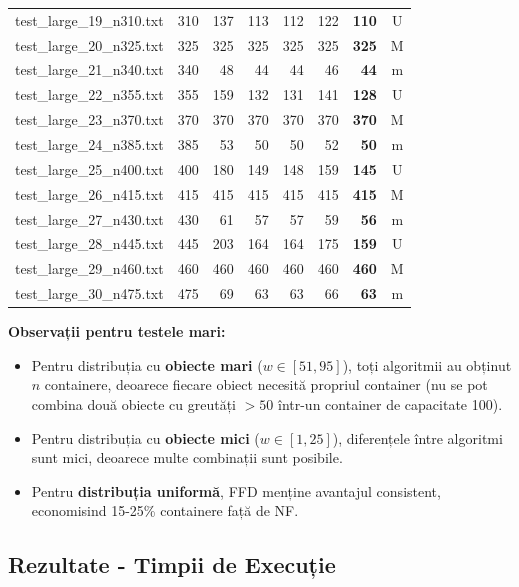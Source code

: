 \documentclass[runningheads]{llncs}
\begin{document}
\begin{table}[H]
\begin{tabular}{|l|r|r|r|r|r|r|c|}
test\_large\_19\_n310.txt & 310 & 137 & 113 & 112 & 122 & \textbf{110} & U \\
test\_large\_20\_n325.txt & 325 & 325 & 325 & 325 & 325 & \textbf{325} & M \\
test\_large\_21\_n340.txt & 340 & 48 & 44 & 44 & 46 & \textbf{44} & m \\
test\_large\_22\_n355.txt & 355 & 159 & 132 & 131 & 141 & \textbf{128} & U \\
test\_large\_23\_n370.txt & 370 & 370 & 370 & 370 & 370 & \textbf{370} & M \\
test\_large\_24\_n385.txt & 385 & 53 & 50 & 50 & 52 & \textbf{50} & m \\
test\_large\_25\_n400.txt & 400 & 180 & 149 & 148 & 159 & \textbf{145} & U \\
test\_large\_26\_n415.txt & 415 & 415 & 415 & 415 & 415 & \textbf{415} & M \\
test\_large\_27\_n430.txt & 430 & 61 & 57 & 57 & 59 & \textbf{56} & m \\
test\_large\_28\_n445.txt & 445 & 203 & 164 & 164 & 175 & \textbf{159} & U \\
test\_large\_29\_n460.txt & 460 & 460 & 460 & 460 & 460 & \textbf{460} & M \\
test\_large\_30\_n475.txt & 475 & 69 & 63 & 63 & 66 & \textbf{63} & m \\
\hline
\end{tabular}
\end{table}

\textbf{Observații pentru testele mari:}
\begin{itemize}
    \item Pentru distribuția cu \textbf{obiecte mari} ($w \in [51, 95]$), toți algoritmii au obținut $n$ containere, deoarece fiecare obiect necesită propriul container (nu se pot combina două obiecte cu greutăți $> 50$ într-un container de capacitate 100).
    \item Pentru distribuția cu \textbf{obiecte mici} ($w \in [1, 25]$), diferențele între algoritmi sunt mici, deoarece multe combinații sunt posibile.
    \item Pentru \textbf{distribuția uniformă}, FFD menține avantajul consistent, economisind 15-25\% containere față de NF.
\end{itemize}

\subsection{Rezultate - Timpii de Execuție}
\end{document}
